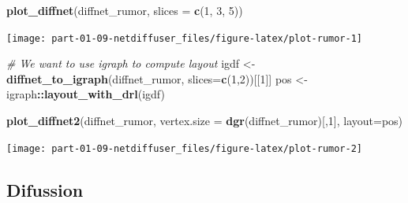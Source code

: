\documentclass[
]{book}
\newenvironment{Shaded}{\begin{snugshade}}{\end{snugshade}}
\newcommand{\AttributeTok}[1]{\textcolor[rgb]{0.13,0.29,0.53}{#1}}
\newcommand{\CommentTok}[1]{\textcolor[rgb]{0.56,0.35,0.01}{\textit{#1}}}
\newcommand{\ConstantTok}[1]{\textcolor[rgb]{0.56,0.35,0.01}{#1}}
\newcommand{\ControlFlowTok}[1]{\textcolor[rgb]{0.13,0.29,0.53}{\textbf{#1}}}
\newcommand{\DecValTok}[1]{\textcolor[rgb]{0.00,0.00,0.81}{#1}}
\newcommand{\FunctionTok}[1]{\textcolor[rgb]{0.13,0.29,0.53}{\textbf{#1}}}
\newcommand{\NormalTok}[1]{#1}
\newcommand{\OtherTok}[1]{\textcolor[rgb]{0.56,0.35,0.01}{#1}}
\newcommand{\SpecialCharTok}[1]{\textcolor[rgb]{0.81,0.36,0.00}{\textbf{#1}}}
\newcommand{\StringTok}[1]{\textcolor[rgb]{0.31,0.60,0.02}{#1}}
\begin{document}
\begin{Shaded}
\begin{Highlighting}[]
\FunctionTok{plot\_diffnet}\NormalTok{(diffnet\_rumor, }\AttributeTok{slices =} \FunctionTok{c}\NormalTok{(}\DecValTok{1}\NormalTok{, }\DecValTok{3}\NormalTok{, }\DecValTok{5}\NormalTok{))}
\end{Highlighting}
\end{Shaded}

\begin{center}\texttt{[image: part-01-09-netdiffuser\_files/figure-latex/plot-rumor-1]} \end{center}

\begin{Shaded}
\begin{Highlighting}[]
\CommentTok{\# We want to use igraph to compute layout}
\NormalTok{igdf }\OtherTok{\textless{}{-}} \FunctionTok{diffnet\_to\_igraph}\NormalTok{(diffnet\_rumor, }\AttributeTok{slices=}\FunctionTok{c}\NormalTok{(}\DecValTok{1}\NormalTok{,}\DecValTok{2}\NormalTok{))[[}\DecValTok{1}\NormalTok{]]}
\NormalTok{pos }\OtherTok{\textless{}{-}}\NormalTok{ igraph}\SpecialCharTok{::}\FunctionTok{layout\_with\_drl}\NormalTok{(igdf)}

\FunctionTok{plot\_diffnet2}\NormalTok{(diffnet\_rumor, }\AttributeTok{vertex.size =} \FunctionTok{dgr}\NormalTok{(diffnet\_rumor)[,}\DecValTok{1}\NormalTok{], }\AttributeTok{layout=}\NormalTok{pos)}
\end{Highlighting}
\end{Shaded}

\begin{center}\texttt{[image: part-01-09-netdiffuser\_files/figure-latex/plot-rumor-2]} \end{center}

\hypertarget{difussion}{%
\subsection{Difussion}\label{difussion}}

\begin{Shaded}
\end{Shaded}
\end{document}
